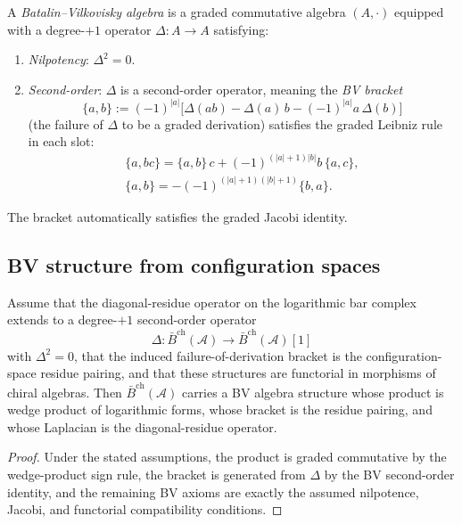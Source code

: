 \begin{definition}[BV algebra]
\label{def:bv-algebra-complete}
A \emph{Batalin--Vilkovisky algebra} is a graded commutative algebra
$(A, \cdot)$ equipped with a degree-$+1$ operator
$\Delta\colon A \to A$ satisfying:
\begin{enumerate}[label=\textup{(\roman*)}]
\item \emph{Nilpotency}: $\Delta^2 = 0$.
\item \emph{Second-order}: $\Delta$ is a second-order operator, meaning the
 \emph{BV bracket}
 \[
 \{a, b\} := (-1)^{|a|}\bigl[\Delta(ab) - \Delta(a)\,b
 - (-1)^{|a|} a\,\Delta(b)\bigr]
 \]
 (the failure of $\Delta$ to be a graded derivation) satisfies the
 graded Leibniz rule in each slot:
 \begin{gather*}
 \{a, bc\} = \{a, b\}\,c + (-1)^{(|a|+1)|b|} b\,\{a, c\},\\
 \{a, b\} = -(-1)^{(|a|+1)(|b|+1)}\{b, a\}.
 \end{gather*}
\end{enumerate}
The bracket automatically satisfies the graded Jacobi identity.
\end{definition}

\subsection{BV structure from configuration spaces}

\begin{theorem}
\label{thm:config-space-bv}
Assume that the diagonal-residue operator on the logarithmic bar
complex extends to a degree-$+1$ second-order operator
\[
\Delta\colon \bar{B}^{\mathrm{ch}}(\mathcal{A})
\longrightarrow
\bar{B}^{\mathrm{ch}}(\mathcal{A})[1]
\]
with $\Delta^2 = 0$, that the induced failure-of-derivation bracket is
the configuration-space residue pairing, and that these structures are
functorial in morphisms of chiral algebras. Then
$\bar{B}^{\mathrm{ch}}(\mathcal{A})$ carries a BV algebra structure
whose product is wedge product of logarithmic forms, whose bracket is
the residue pairing, and whose Laplacian is the diagonal-residue
operator.
\end{theorem}

\begin{proof}
Under the stated assumptions, the product is graded commutative by the
wedge-product sign rule, the bracket is generated from $\Delta$ by the
BV second-order identity, and the remaining BV axioms are exactly the
assumed nilpotence, Jacobi, and functorial compatibility conditions.
\end{proof}

